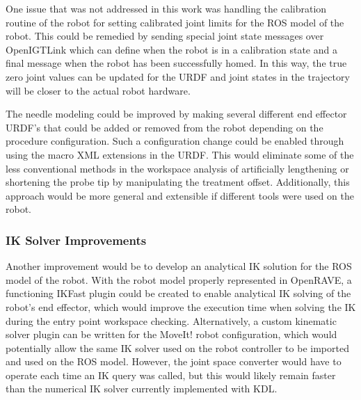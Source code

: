 \documentclass[12pt]{report}
\begin{document}
One issue that was not addressed in this work was handling the calibration routine of the robot for setting calibrated joint limits for the ROS model of the robot. This could be remedied by sending special joint state messages over OpenIGTLink which can define when the robot is in a calibration state and a final message when the robot has been successfully homed. In this way, the true zero joint values can be updated for the URDF and joint states in the trajectory will be closer to the actual robot hardware.

The needle modeling could be improved by making several different end effector URDF's that could be added or removed from the robot depending on the procedure configuration. Such a configuration change could be enabled through using the macro XML extensions in the URDF. This would eliminate some of the less conventional methods in the workspace analysis of artificially lengthening or shortening the probe tip by manipulating the treatment offset. Additionally, this approach would be more general and extensible if different tools were used on the robot.

\subsubsection{IK Solver Improvements}
Another improvement would be to develop an analytical IK solution for the ROS model of the robot. With the robot model properly represented in OpenRAVE, a functioning IKFast plugin could be created to enable analytical IK solving of the robot's end effector, which would improve the execution time when solving the IK during the entry point workspace checking. Alternatively, a custom kinematic solver plugin can be written for the MoveIt! robot configuration, which would potentially allow the same IK solver used on the robot controller to be imported and used on the ROS model. However, the joint space converter would have to operate each time an IK query was called, but this would likely remain faster than the numerical IK solver currently implemented with KDL. 
\end{document}
